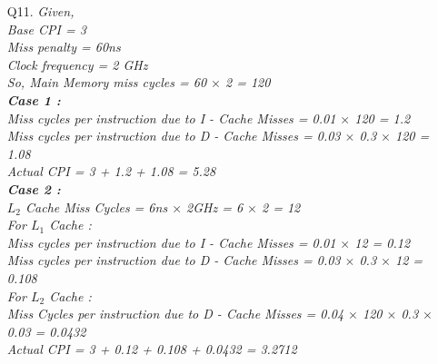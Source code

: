\documentclass[letterpaper]{article}
\begin{document}
\begin{large}
\begin{flushleft}
\begin{enumerate}
\item[Q11.]
\textit{Given,\\[0.1in]
Base CPI = 3\\[0.1in]
Miss penalty = 60ns\\[0.1in]
Clock frequency = 2 GHz\\[0.1in]
So, Main Memory miss cycles = 60 $\times$ 2 = 120\\[0.1in]
\textbf{Case 1 :}\\[0.1in]
Miss cycles per instruction due to I - Cache Misses = 0.01 $\times$ 120 = 1.2\\[0.1in]
Miss cycles per instruction due to D - Cache Misses = 0.03 $\times$ 0.3 $\times$ 120 = 1.08\\[0.1in]
Actual CPI = 3 + 1.2 + 1.08 = 5.28\\[0.1in]
\textbf{Case 2 :}\\[0.1in]
$L_2$ Cache Miss Cycles = 6ns $\times$ 2GHz = 6 $\times$ 2 = 12\\[0.1in] 
For $L_1$ Cache :\\[0.1in]
Miss cycles per instruction due to I - Cache Misses = 0.01 $\times$ 12 = 0.12\\[0.1in]
Miss cycles per instruction due to D - Cache Misses = 0.03 $\times$ 0.3 $\times$ 12 = 0.108\\[0.1in]
For $L_2$ Cache :\\[0.1in]
Miss Cycles per instruction due to D - Cache Misses = 0.04 $\times$ 120 $\times$ 0.3 $\times$ 0.03 = 0.0432\\[0.1in]
Actual CPI = 3 + 0.12 + 0.108 + 0.0432 = 3.2712\\[0.1in]}
\end{enumerate}
\end{flushleft}
\end{large}
\end{document}
